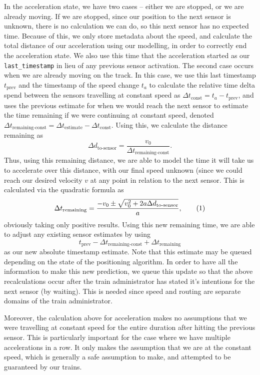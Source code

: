 \documentclass[12pt, titlepage]{article}
\newcommand{\numeq}{\addtocounter{equation}{1}\tag{\theequation}}
\begin{document}
    In the acceleration state, we have two cases -- either we are stopped, or we are already moving. If we are stopped, since our position to the next sensor is unknown, there is no calculation we can do, so this next sensor has no expected time. Because of this, we only store metadata about the speed, and calculate the total distance of our acceleration using our modelling, in order to correctly end the acceleration state. We also use this time that the acceleration started as our \verb`last_timestamp` in lieu of any previous sensor activation. The second case occurs when we are already moving on the track. In this case, we use this last timestamp $t_\text{prev}$ and the timestamp of the speed change $t_a$ to calculate the relative time delta spend between the sensors travelling at constant speed as $\Delta t_\text{const} = t_a - t_\text{prev}$, and uses the previous estimate for when we would reach the next sensor to estimate the time remaining if we were  continuing at constant speed, denoted $\Delta t_\text{remaining-const} = \Delta t_\text{estimate} - \Delta t_\text{const}$. Using this, we calculate the distance remaining as
    \[
        \Delta d_\text{to-sensor} = \frac{v_0}{\Delta t_\text{remaining-const}}.
    \]
    Thus, using this remaining distance, we are able to model the time it will take us to accelerate over this distance, with our final speed unknown (since we could reach our desired velocity $v$ at any point in relation to the next sensor. This is calculated via the quadratic formula as
    \[
        \Delta t_\text{remaining} = \frac{-v_0 \pm \sqrt{v_0^2 + 2a\Delta d_\text{to-sensor}}}{a}, \numeq\label{eq:estimate_initial_accel}
    \]
    obviously taking only positive results. Using this new remaining time, we are able to adjust any existing sensor estimates by using
    \[
        t_\text{prev} - \Delta t_\text{remaining-const} + \Delta t_\text{remaining}
    \]
    as our new absolute timestamp estimate. Note that this estimate may be queued depending on the state of the positioning algorithm. In order to have all the information to make this new prediction, we queue this update so that the above recalculations occur after the train administrator has stated it's intentions for the next sensor (by waiting). This is needed since speed and routing are separate domains of the train administrator.
    
    Moreover, the calculation above for acceleration makes no assumptions that we were travelling at constant speed for the entire duration after hitting the previous sensor. This is particularly important for the case where we have multiple accelerations in a row. It only makes the assumption that we are at the constant speed, which is generally a safe assumption to make, and attempted to be guaranteed by our trains.
    
\end{document}
